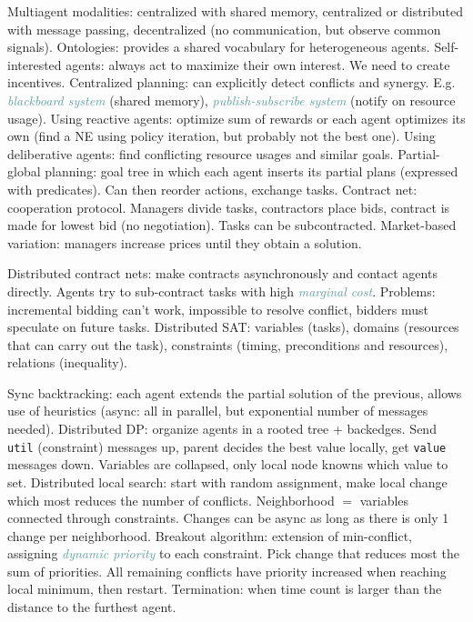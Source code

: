 \documentclass[10pt,a4paper,landscape]{article}
\newcommand{\concept}[1]{\textcolor{Emerald}{#1}} %
\newcommand{\subconcept}[1]{\textcolor{CadetBlue}{\textit{#1}}}
\newcommand{\opt}[1]{#1}
\renewcommand{\opt}[1]{}
\renewcommand{\section}[1]{
    \vspace{-0.3cm}
    \begin{center}
      \color{Bittersweet}
      \hrulefill{\small~~#1~~}\hrulefill
    \end{center}
    \vspace{-0.3cm}
  }
\renewcommand{\subsection}[1]{\section{#1}}
\begin{document}
\begin{multicols*}{4}
\concept{Multiagent modalities}: centralized with shared memory, centralized or distributed with message passing, decentralized (no communication, but observe common signals).
\concept{Ontologies}: provides a shared vocabulary for heterogeneous agents.
\concept{Self-interested} agents: always act to maximize their own interest. We need to create incentives.
\concept{Centralized planning}: can explicitly detect conflicts and synergy. E.g. \subconcept{blackboard system} (shared memory), \subconcept{publish-subscribe system} (notify on resource usage).
Using reactive agents: optimize sum of rewards or each agent optimizes its own (find a NE using policy iteration, but probably not the best one).
Using deliberative agents: find conflicting resource usages and similar goals.
\concept{Partial-global planning}: goal tree in which each agent inserts its partial plans (expressed with predicates). Can then reorder actions, exchange tasks.
\concept{Contract net}: cooperation protocol. Managers divide tasks, contractors place bids, contract is made for lowest bid (no negotiation). Tasks can be subcontracted. Market-based variation: managers increase prices until they obtain a solution.

\subsection{Distributed multiagent systems}

\concept{Distributed contract nets}: make contracts asynchronously and contact agents directly. Agents try to sub-contract tasks with high \subconcept{marginal cost}. Problems: incremental bidding can't work, impossible to resolve conflict, bidders must speculate on future tasks.
\concept{Distributed SAT}: variables (tasks), domains (resources that can carry out the task), constraints (timing, preconditions and resources), relations (inequality).
\opt{
  Solved using \subconcept{dynamic programming} (eliminate variables by replacing them with constraints), \subconcept{local parallel search} (start randomly, make local changes that reduce the number of violations).
}
\concept{Sync backtracking}: each agent extends the partial solution of the previous, allows use of heuristics (async: all in parallel, but exponential number of messages needed).
\concept{Distributed DP}: organize agents in a rooted tree + backedges. Send \texttt{util} (constraint) messages up, parent decides the best value locally, get \texttt{value} messages down. Variables are collapsed, only local node knowns which value to set.
\concept{Distributed local search}: start with random assignment, make local change which most reduces the number of conflicts. Neighborhood $=$ variables connected through constraints. Changes can be async as long as there is only 1 change per neighborhood.
\concept{Breakout algorithm}: extension of min-conflict, assigning \subconcept{dynamic priority} to each constraint. Pick change that reduces most the sum of priorities. All remaining conflicts have priority increased when reaching local minimum, then restart. Termination: when time count is larger than the distance to the furthest agent.


\end{multicols*}
\end{document}
